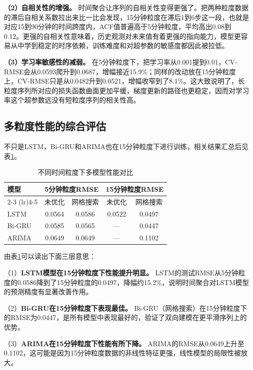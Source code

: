 \documentclass[12pt,a4paper,oneside]{ctexbook}
\begin{document}
	\textbf{（2）自相关性的增强。} 时间聚合让序列的自相关性变得更强了。把两种粒度数据的滞后自相关系数拉出来比一比会发现，15分钟粒度在滞后1到6步这一段，也就是对应15到90分钟的时间跨度内，ACF值普遍高于5分钟粒度，平均高出0.08到0.12。更强的自相关性意味着，历史观测对未来值有着更强的指向能力，模型更容易从中学到稳定的时序依赖，训练难度和对超参数的敏感度都因此被拉低。
	
	\textbf{（3）学习率敏感性的减弱。} 在5分钟粒度下，把学习率从0.001提到0.01，CV-RMSE会从0.0593爬升到0.0687，增幅接近15.9\%；同样的改动放在15分钟粒度上，CV-RMSE只是从0.0482升到0.0521，增幅收窄到了8.1\%。这大致说明了，长粒度序列所对应的损失函数曲面更加平缓，梯度更新的路径也更稳定，因而对学习率这个超参数远没有短粒度序列的相关性高。
	
	\subsection{多粒度性能的综合评估}
	
	不只是LSTM，Bi-GRU和ARIMA也在15分钟粒度下进行训练，相关结果汇总后见表\ref{tab:multi_model_granularity}。
	
	\begin{table}[H]
		\centering
		\caption{不同时间粒度下多模型性能对比}
		\label{tab:multi_model_granularity}
		\begin{tabular}{lcccc}
			\toprule
			模型 & \multicolumn{2}{c}{5分钟粒度RMSE} & \multicolumn{2}{c}{15分钟粒度RMSE} \\
			\cmidrule(lr){2-3} \cmidrule(lr){4-5}
			& 未优化 & 网格搜索 & 未优化 & 网格搜索 \\
			\midrule
			LSTM   & 0.0564 & 0.0586 & 0.0522 & 0.0497 \\
			Bi-GRU & 0.0585 & 0.0565 & —      & 0.0447 \\
			ARIMA  & 0.0649 & 0.0649 & —      & 0.1102 \\
			\bottomrule
		\end{tabular}
	\end{table}
	
	由表\ref{tab:multi_model_granularity}可以读出下面三层意思：
	
	（1）\textbf{LSTM模型在15分钟粒度下性能提升明显。} LSTM的测试RMSE从5分钟粒度的0.0586降到了15分钟粒度的0.0497，降幅约15.2\%，说明时间聚合对LSTM模型的预测精度有显著改善作用。
	
	（2）\textbf{Bi-GRU在15分钟粒度下表现最佳。} Bi-GRU（网格搜索）在15分钟粒度下的RMSE为0.0447，是所有模型中表现最好的，验证了双向建模在更平滑序列上的优势。
	
	（3）\textbf{ARIMA在15分钟粒度下性能有所下降。} ARIMA的RMSE从0.0649上升至0.1102，这可能是因为15分钟粒度数据的非线性特征更强，线性模型的局限性被放大。
	
\end{document}
